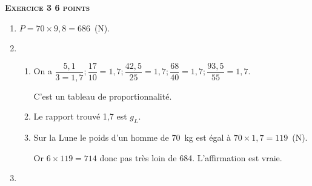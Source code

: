 \textbf{\textsc{Exercice 3 \hfill 6 points}}

\medskip
 
% 
% 
% 
% 
%
 
\begin{enumerate}
\item %
$P = 70 \times 9,8 = 686$~(N). 
\item %
 
%
%

\medskip
 
	\begin{enumerate}
		\item %
On a $\dfrac{5,1}{3 = 1,7} ;    \dfrac{17}{10} = 1,7   ; \dfrac{42,5}{25} = 1,7  ; \dfrac{68}{40} = 1,7 ; \dfrac{93,5}{55} = 1,7$.

C'est un tableau de proportionnalité.
		\item %
Le rapport trouvé 1,7 est $g_L$. 
		\item %
Sur la Lune le poids d'un homme de 70~kg est égal à $70 \times 1,7 = 119$~(N).
		
Or $6 \times 119 = 714$ donc pas très loin de 684. L'affirmation est vraie.
	\end{enumerate} 
\item %


\end{enumerate}
